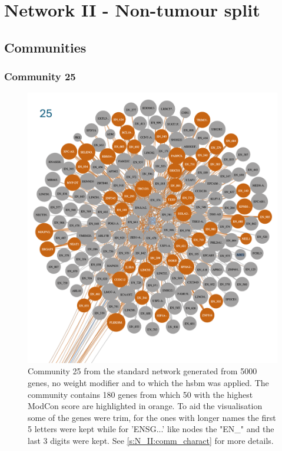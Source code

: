 \section{Network II - Non-tumour split}


\subsection{Communities} \label{ap:N_II:coms}

\subsubsection{Community 25}

\begin{figure}[H]    
    \centering
    \includegraphics[width=1.0\textwidth,height=1.0\textheight,keepaspectratio]{Sections/Network_II/resources/non_tum/25_com.png}
    \caption{Community 25 from the standard network generated from 5000 genes, no weight modifier and to which the \acrshort{hsbm} was applied. The community contains 180 genes from which 50 with the highest ModCon score are highlighted in orange. To aid the visualisation some of the genes were trim, for the ones with longer names the first 5 letters were kept while for 'ENSG...' like nodes the "EN\_" and the last 3 digits were kept. See \cref{s:N_II:comm_charact} for more details. }
    \label{fig:ap:com_29}
\end{figure}


